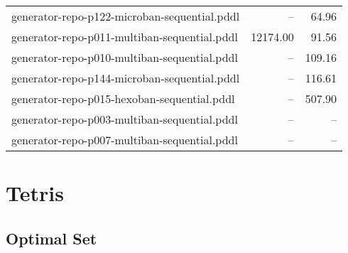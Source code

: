 \documentclass{article}
\begin{document}
\begin{center}
\begin{tabular}{@{}l|r|r@{}}
 generator-repo-p122-microban-sequential.pddl&--&64.96\\
 generator-repo-p011-multiban-sequential.pddl&12174.00&91.56\\
 generator-repo-p010-multiban-sequential.pddl&--&109.16\\
 generator-repo-p144-microban-sequential.pddl&--&116.61\\
 generator-repo-p015-hexoban-sequential.pddl&--&507.90\\
 generator-repo-p003-multiban-sequential.pddl&--&--\\
 generator-repo-p007-multiban-sequential.pddl&--&--
                            \end{tabular}
                            \end{center}
                    
                \newpage \section{Tetris}
                    \subsection*{Optimal Set}
                    
\end{document}

